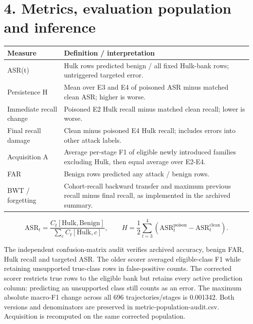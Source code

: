 \documentclass[
  10pt,
  a4paper,
]{article}
\begin{document}
\hypertarget{metrics-evaluation-population-and-inference}{%
\section{4. Metrics, evaluation population and
inference}\label{metrics-evaluation-population-and-inference}}

\begin{longtable}[]{@{}
  >{\raggedright\arraybackslash}p{}
  >{\raggedright\arraybackslash}p{}@{}}
\toprule
Measure & Definition / interpretation \\
\midrule
\endhead
ASR(t) & Hulk rows predicted benign / all fixed Hulk-bank rows;
untriggered targeted error. \\
Persistence H & Mean over E3 and E4 of poisoned ASR minus matched clean
ASR; higher is worse. \\
Immediate recall change & Poisoned E2 Hulk recall minus matched clean
recall; lower is worse. \\
Final recall damage & Clean minus poisoned E4 Hulk recall; includes
errors into other attack labels. \\
Acquisition A & Average per-stage F1 of eligible newly introduced
families excluding Hulk, then equal average over E2-E4. \\
FAR & Benign rows predicted any attack / benign rows. \\
BWT / forgetting & Cohort-recall backward transfer and maximum previous
recall minus final recall, as implemented in the archived summary. \\
\bottomrule
\end{longtable}

\[\mathrm{ASR}_t=\frac{C_t[\mathrm{Hulk},\mathrm{Benign}]}{\sum_c C_t[\mathrm{Hulk},c]},\qquad H=\frac12\sum_{t=3}^{4}(\mathrm{ASR}^{\mathrm{poison}}_t-\mathrm{ASR}^{\mathrm{clean}}_t).\]

The independent confusion-matrix audit verifies archived accuracy,
benign FAR, Hulk recall and targeted ASR. The older scorer averaged
eligible-class F1 while retaining unsupported true-class rows in
false-positive counts. The corrected scorer restricts true rows to the
eligible bank but retains every active prediction column: predicting an
unsupported class still counts as an error. The maximum absolute
macro-F1 change across all 696 trajectories/stages is 0.001342. Both
versions and denominators are preserved in metric-population-audit.csv.
Acquisition is recomputed on the same corrected population.
\end{document}
